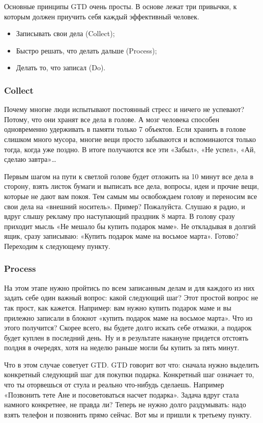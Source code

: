 Основные принципы GTD очень просты. В основе лежат три привычки, к которым должен приучить себя каждый эффективный человек.
\begin{itemize}
  \item Записывать свои дела (Collect);
  \item Быстро решать, что делать дальше (Process);
  \item Делать то, что записал (Do).
\end{itemize}


\subsubsection{Collect }

Почему многие люди испытывают постоянный стресс и ничего не успевают? Потому, что они хранят все дела в голове. А мозг человека способен одновременно удерживать в памяти только 7 объектов. Если хранить в голове слишком много мусора, многие вещи просто забываются и вспоминаются только тогда, когда уже поздно. В итоге получаются все эти «Забыл», «Не успел», «Ай, сделаю завтра»…

Первым шагом на пути к светлой голове будет отложить на 10 минут все дела в сторону, взять листок бумаги и выписать все дела, вопросы, идеи и прочие вещи, которые не дают вам покоя. Тем самым мы освобождаем голову и переносим все свои дела на «внешний носитель».
Пример? Пожалуйста. Слушаю я радио, и вдруг слышу рекламу про наступающий праздник 8 марта. В голову сразу приходит мысль «Не мешало бы купить подарок маме». Не откладывая в долгий ящик, сразу записываю: «Купить подарок маме на восьмое марта».
Готово? Переходим к следующему пункту.

\subsubsection{Process }

На этом этапе нужно пройтись по всем записанным делам и для каждого из них задать себе один важный вопрос: какой следующий шаг?
Этот простой вопрос не так прост, как кажется. Например: вам нужно купить подарок маме и вы прилежно записали в блокнот «купить подарок маме на восьмое марта».
Что из этого получится? Скорее всего, вы будете долго искать себе отмазки, а подарок будет куплен в последний день. Ну и в результате накануне придется отстоять полдня в очередях, хотя на неделю раньше могли бы купить за пять минут.

Что в этом случае советует GTD.
GTD говорит вот что: сначала нужно выделить конкретный следующий шаг для покупки подарка. Конкретный шаг означает то, что ты оторвешься от стула и реально что-нибудь сделаешь. Например «Позвонить тете Ане и посоветоваться насчет подарка». Задача вдруг стала намного конкретнее, не правда ли? Теперь не нужно долго раздумывать: надо взять телефон и позвонить прямо сейчас.
Вот мы и пришли к третьему пункту.


